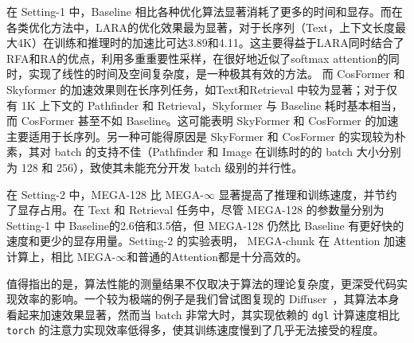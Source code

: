 在 Setting-1 中，Baseline 相比各种优化算法显著消耗了更多的时间和显存。而在各类优化方法中，LARA的优化效果最为显著，对于长序列（Text，上下文长度最大4K）在训练和推理时的加速比可达3.89和4.11。这主要得益于LARA同时结合了RFA和RA的优点，利用多重重要性采样，在很好地近似了softmax attention的同时，实现了线性的时间及空间复杂度，是一种极其有效的方法。 而 CosFormer 和 Skyformer 的加速效果则在长序列任务，如Text和Retrieval 中较为显著；对于仅有 1K 上下文的 Pathfinder 和 Retrieval，Skyformer 与 Baseline 耗时基本相当，而 CosFormer 甚至不如 Baseline。这可能表明 SkyFormer 和 CosFormer 的加速主要适用于长序列。另一种可能得原因是 SkyFormer 和 CosFormer 的实现较为朴素，其对 batch 的支持不佳（Pathfinder 和 Image 在训练时的的 batch 大小分别为 128 和 256），致使其未能充分开发 batch 级别的并行性。

在 Setting-2 中，MEGA-128 比 MEGA-$\infty$ 显著提高了推理和训练速度，并节约了显存占用。在 Text 和 Retrieval 任务中，尽管 MEGA-128 的参数量分别为Setting-1 中 Baseline的2.6倍和3.5倍，但 MEGA-128 仍然比 Baseline 有更好快的速度和更少的显存用量。Setting-2 的实验表明， MEGA-chunk 在 Attention 加速计算上，相比 MEGA-$\infty$和普通的Attention都是十分高效的。

值得指出的是，算法性能的测量结果不仅取决于算法的理论复杂度，更深受代码实现效率的影响。一个较为极端的例子是我们曾试图复现的 Diffuser~\cite{feng2023diffuser}，其算法本身看起来加速效果显著，然而当 batch 非常大时，其实现依赖的 \verb|dgl| 计算速度相比 \verb|torch| 的注意力实现效率低得多，使其训练速度慢到了几乎无法接受的程度。





